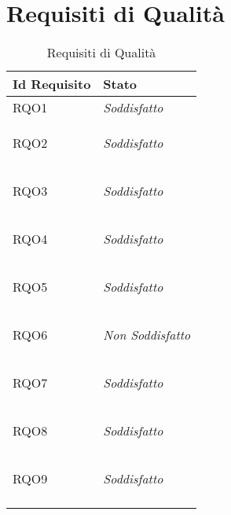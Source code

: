 \section{Requisiti di Qualità}
\normalsize
\begin{longtable}{|>{\centering}m{5cm}|m{5cm}<{\centering}|}
    \hline
    \textbf{Id Requisito} & \textbf{Stato}\\
    \hline
    \endhead
    \hypertarget{RQO1}{RQO1} & \textit{Soddisfatto}\\ \hline
   
    \hypertarget{RQO2}{RQO2} & \textit{Soddisfatto}\\ \hline
   
    \hypertarget{RQO3}{RQO3} & \textit{Soddisfatto}\\ \hline
   
    \hypertarget{RQO4}{RQO4} & \textit{Soddisfatto}\\ \hline
   
    \hypertarget{RQO5}{RQO5} & \textit{Soddisfatto}\\ \hline
   
    \hypertarget{RQO6}{RQO6} & \textit{Non Soddisfatto}\\ \hline
   
    \hypertarget{RQO7}{RQO7} & \textit{Soddisfatto}\\ \hline
   
    \hypertarget{RQO8}{RQO8} & \textit{Soddisfatto}\\ \hline
   
    \hypertarget{RQO9}{RQO9} & \textit{Soddisfatto}\\ \hline
   
    \caption[Requisiti di Qualità]{Requisiti di Qualità}
    \label{tabella:req2}
\end{longtable}
\clearpage
